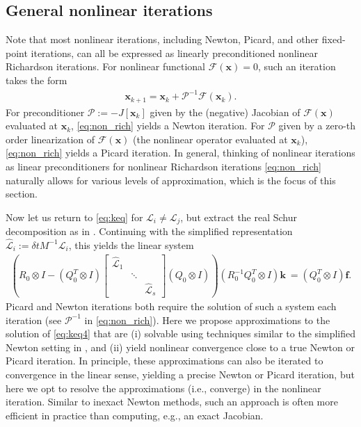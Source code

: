 \documentclass[review]{siamart}
\begin{document}
\subsection{General nonlinear iterations}\label{sec:nonlinear:gen}

Note that most nonlinear iterations, including Newton, Picard, and
other fixed-point iterations, can all be expressed as linearly preconditioned
nonlinear Richardson iterations. For nonlinear functional
$\mathcal{F}(\mathbf{x}) = 0$, such an iteration takes the form
%
\begin{align}\label{eq:non_rich}
\mathbf{x}_{k+1} = \mathbf{x}_k + \mathcal{P}^{-1}\mathcal{F}(\mathbf{x}_k).
\end{align}
%
For preconditioner $\mathcal{P} := -J[\mathbf{x}_k]$ given by the (negative)
Jacobian of $\mathcal{F}(\mathbf{x})$ evaluated at $\mathbf{x}_k$, \eqref{eq:non_rich}
yields a Newton iteration. For $\mathcal{P}$ given by a zero-th order linearization
of $\mathcal{F}(\mathbf{x})$ (the nonlinear operator evaluated at $\mathbf{x}_k$),
\eqref{eq:non_rich} yields a Picard iteration. In general, thinking of nonlinear
iterations as linear preconditioners for nonlinear Richardson iterations
\eqref{eq:non_rich} naturally allows for various levels of approximation,
which is the focus of this section.

Now let us return to \eqref{eq:keq} for $\mathcal{L}_i\neq\mathcal{L}_j$, but
extract the real Schur decomposition as in . Continuing
with the simplified representation $\widehat{\mathcal{L}}_i := \delta t M^{-1}\mathcal{L}_i$,
this yields the linear system
%
\begin{align}\label{eq:keq4}
\left( R_0\otimes I - (Q_0^T\otimes I) \begin{bmatrix}
	\widehat{\mathcal{L}}_1  & \\ & \ddots \\ && \widehat{\mathcal{L}}_s\end{bmatrix}
	(Q_0\otimes I)\right) (R_0^{-1}Q_0^T\otimes I) \mathbf{k}\
= (Q_0^T\otimes I)\mathbf{f}.
\end{align}
%
Picard and Newton iterations both require the solution of such a system each
iteration (see $\mathcal{P}^{-1}$ in \eqref{eq:non_rich}). Here we propose
approximations to the solution of \eqref{eq:keq4} that are (i) solvable using
techniques similar to the simplified Newton setting in , and
(ii) yield nonlinear  convergence close to a true Newton or Picard iteration. In principle,
these approximations can also be iterated to convergence in the linear sense, yielding
a precise Newton or Picard iteration, but here we opt to resolve the approximations
(i.e., converge) in the nonlinear iteration. Similar to inexact Newton methods,
such an approach is often more efficient in practice than computing, e.g., an exact
Jacobian.
\end{document}
